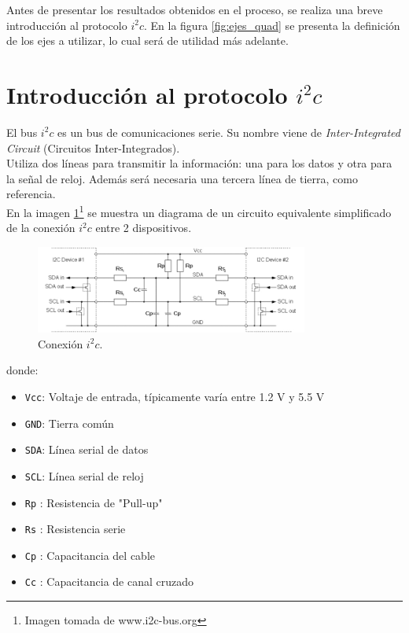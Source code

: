 \documentclass[main]{subfiles}
\begin{document}
Antes de presentar los resultados obtenidos en el proceso, se realiza una breve introducci\'on al protocolo $i^2c$. En la figura \ref{fig:ejes_quad} se presenta la definici\'on de los ejes a utilizar, lo cual ser\'a de utilidad m\'as adelante.

\newpage
\section{Introducci\'on al protocolo $i^2c$}

El bus $i^2c$ es un bus de comunicaciones serie. Su nombre viene de \emph{Inter-Integrated Circuit} (Circuitos Inter-Integrados).\\
Utiliza dos l\'ineas para transmitir la informaci\'on: una para los datos y otra para la señal de reloj. Adem\'as ser\'a necesaria una tercera l\'inea de tierra, como referencia.\\
En la imagen \ref{fig:setup}\footnote{Imagen tomada de www.i2c-bus.org} se muestra un diagrama de un circuito equivalente simplificado de la conexi\'on $i^2c$ entre 2 dispositivos.

\begin{figure}[h!]
	\centering
	\includegraphics[width=0.8\textwidth]{./pics_sniffer/setup.jpg}
	\caption{Conexi\'on $i^2c$.}
	\label{fig:setup}
\end{figure}
donde:
\begin{itemize}
\item \verb+Vcc+:	 Voltaje de entrada, t\'ipicamente var\'ia entre 1.2 V y 5.5 V
\item \verb+GND+:	 Tierra com\'un
\item \verb+SDA+:	 L\'inea serial de datos
\item \verb+SCL+:	 L\'inea serial de reloj
\item \verb+Rp+ :	 Resistencia de "Pull-up"
\item \verb+Rs+ :	 Resistencia serie
\item \verb+Cp+ :	 Capacitancia del cable
\item \verb+Cc+ :	 Capacitancia de canal cruzado
\end{itemize}
\end{document}
